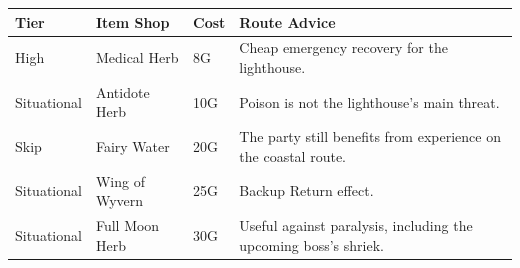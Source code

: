 \documentclass[
  american,
  10pt,
  letterpaper,
  oneside,
  open=any]{scrreprt}
\newcounter{none} %
\newenvironment{guidetable}{%
  \small\setstretch{1.0}%
  \setlength{\tabcolsep}{4pt}%
  \setlength{\LTpre}{8pt}\setlength{\LTpost}{10pt}%
  \renewcommand{\arraystretch}{1.16}%
}{ }
\begin{document}
\begin{guidetable}

{\def\LTcaptype{none} %
\begin{longtable}[]{@{}
  >{\raggedright\arraybackslash}p{}
  >{\raggedright\arraybackslash}p{}
  >{\raggedleft\arraybackslash}p{}
  >{\raggedright\arraybackslash}p{}@{}}
\toprule\noalign{}
\begin{minipage}[b]{\linewidth}\raggedright
\color{GuideGreen}\bfseries Tier
\end{minipage} & \begin{minipage}[b]{\linewidth}\raggedright
\color{GuideGreen}\bfseries Item Shop
\end{minipage} & \begin{minipage}[b]{\linewidth}\raggedleft
\color{GuideGreen}\bfseries Cost
\end{minipage} & \begin{minipage}[b]{\linewidth}\raggedright
\color{GuideGreen}\bfseries Route Advice
\end{minipage} \\
\midrule\noalign{}
\endhead
\bottomrule\noalign{}
\endlastfoot
High & Medical Herb & 8G & Cheap emergency recovery for the
lighthouse. \\
Situational & Antidote Herb & 10G & Poison is not the lighthouse's main
threat. \\
Skip & Fairy Water & 20G & The party still benefits from experience on
the coastal route. \\
Situational & Wing of Wyvern & 25G & Backup Return effect. \\
Situational & Full Moon Herb & 30G & Useful against paralysis, including
the upcoming boss's shriek. \\
\end{longtable}
}

\end{guidetable}
\end{document}
